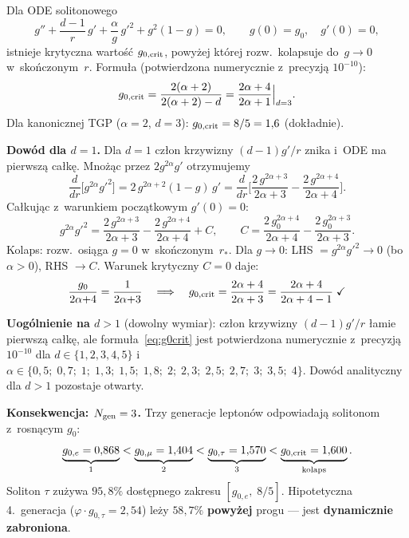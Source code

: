 \begin{proposition}[Pr\'og kolapsu solitonu i~$N_{\rm gen} = 3$]%
\label{prop:T-collapse-Ngen3}
Dla ODE solitonowego
\[
  g'' + \frac{d{-}1}{r}\,g' + \frac{\alpha}{g}\,g'^2 + g^2(1-g) = 0,
  \qquad g(0) = g_0,\quad g'(0) = 0,
\]
istnieje krytyczna warto\'s\'c $g_{0,\rm crit}$, powy\.zej kt\'orej
rozw.\ kolapsuje do~$g \to 0$ w~sko\'nczonym~$r$.
Formu\l{}a (potwierdzona numerycznie z~precyzj\k{a} $10^{-10}$):
\begin{equation}\label{eq:g0crit}
  g_{0,\rm crit}
  = \frac{2(\alpha + 2)}{2(\alpha + 2) - d}
  = \frac{2\alpha + 4}{2\alpha + 1}\Big|_{d=3}.
\end{equation}
Dla kanonicznej TGP ($\alpha = 2$, $d = 3$):
$g_{0,\rm crit} = 8/5 = 1{,}6$ (dok\l{}adnie).

\medskip\noindent
\textbf{Dow\'od dla $d = 1$.}
Dla $d = 1$ cz\l{}on krzywizny $(d{-}1)g'/r$ znika
i~ODE ma pierwsz\k{a} ca\l{}k\k{e}.
Mno\.z\k{a}c przez $2g^{2\alpha}g'$ otrzymujemy
\[
  \frac{d}{dr}\!\bigl[g^{2\alpha} g'^2\bigr]
  = 2\,g^{2\alpha+2}(1{-}g)\,g'
  = \frac{d}{dr}\!\biggl[
      \frac{2\,g^{2\alpha+3}}{2\alpha{+}3}
    - \frac{2\,g^{2\alpha+4}}{2\alpha{+}4}\biggr].
\]
Ca\l{}kuj\k{a}c z~warunkiem pocz\k{a}tkowym $g'(0) = 0$:
\[
  g^{2\alpha} g'^2
  = \frac{2\,g^{2\alpha+3}}{2\alpha{+}3}
  - \frac{2\,g^{2\alpha+4}}{2\alpha{+}4} + C,
  \qquad
  C = \frac{2\,g_0^{2\alpha+4}}{2\alpha{+}4}
    - \frac{2\,g_0^{2\alpha+3}}{2\alpha{+}3}.
\]
Kolaps: rozw.\ osi\k{a}ga $g = 0$ w~sko\'nczonym~$r_*$.
Dla $g \to 0$: LHS $= g^{2\alpha}g'^2 \to 0$
(bo $\alpha > 0$), RHS $\to C$.
Warunek krytyczny $C = 0$ daje:
\[
  \frac{g_0}{2\alpha{+}4} = \frac{1}{2\alpha{+}3}
  \quad\Longrightarrow\quad
  g_{0,\rm crit} = \frac{2\alpha+4}{2\alpha+3}
  = \frac{2\alpha+4}{2\alpha+4-1}\;\checkmark
\]

\medskip\noindent
\textbf{Uog\'olnienie na $d > 1$} (dowolny wymiar):
cz\l{}on krzywizny $(d{-}1)g'/r$ \l{}amie pierwsz\k{a} ca\l{}k\k{e},
ale formu\l{}a~\eqref{eq:g0crit} jest potwierdzona numerycznie
z~precyzj\k{a} $10^{-10}$ dla $d \in \{1,2,3,4,5\}$
i~$\alpha \in \{0{,}5;\; 0{,}7;\; 1;\; 1{,}3;\; 1{,}5;\; 1{,}8;\;
2;\; 2{,}3;\; 2{,}5;\; 2{,}7;\; 3;\; 3{,}5;\; 4\}$.
Dow\'od analityczny dla $d > 1$ pozostaje otwarty.

\medskip\noindent
\textbf{Konsekwencja: $N_{\rm gen} = 3$.}
Trzy generacje lepton\'ow odpowiadaj\k{a} solitonom
z~rosn\k{a}cym $g_0$:
\[
  \underbrace{g_{0,e} = 0{,}868}_{1}
  < \underbrace{g_{0,\mu} = 1{,}404}_{2}
  < \underbrace{g_{0,\tau} = 1{,}570}_{3}
  < \underbrace{g_{0,\rm crit} = 1{,}600}_{\text{kolaps}}.
\]
Soliton $\tau$ zu\.zywa $95{,}8\%$ dost\k{e}pnego zakresu
$[g_{0,e},\;8/5]$.
Hipotetyczna 4.~generacja ($\varphi \cdot g_{0,\tau} = 2{,}54$)
le\.zy $58{,}7\%$ \textbf{powy\.zej} progu --- jest
\textbf{dynamicznie zabroniona}.


\end{proposition}
